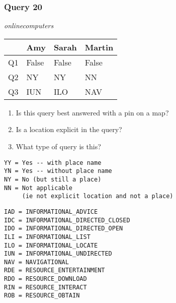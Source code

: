 \begin{frame}[fragile]
\frametitle{Query 20}
\vspace{1em}

\emph{onlinecomputers}

\vfill

\begin{table}
  \centering
  \begin{tabular}{ l l l l }
    & \textbf{Amy} & \textbf{Sarah} & \textbf{Martin}\\
    \toprule
    Q1 & False & False & False\\
Q2 & NY & NY & NN\\
Q3 & IUN & ILO & NAV\\
    \bottomrule
  \end{tabular}
\end{table}

\vfill

\tiny{

\begin{enumerate}
\item Is this query best answered with a pin on a map?
\item Is a location explicit in the query?
\item What type of query is this?
\end{enumerate}

\vfill

\begin{multicols}{2}
\begin{verbatim}
YY = Yes -- with place name
YN = Yes -- without place name
NY = No (but still a place)
NN = Not applicable 
     (ie not explicit location and not a place)
\end{verbatim}

\columnbreak
\begin{verbatim}
IAD = INFORMATIONAL_ADVICE
IDC = INFORMATIONAL_DIRECTED_CLOSED
IDO = INFORMATIONAL_DIRECTED_OPEN
ILI = INFORMATIONAL_LIST
ILO = INFORMATIONAL_LOCATE
IUN = INFORMATIONAL_UNDIRECTED
NAV = NAVIGATIONAL
RDE = RESOURCE_ENTERTAINMENT
RDO = RESOURCE_DOWNLOAD
RIN = RESOURCE_INTERACT
ROB = RESOURCE_OBTAIN
\end{verbatim}
\end{multicols}
}

\end{frame}


